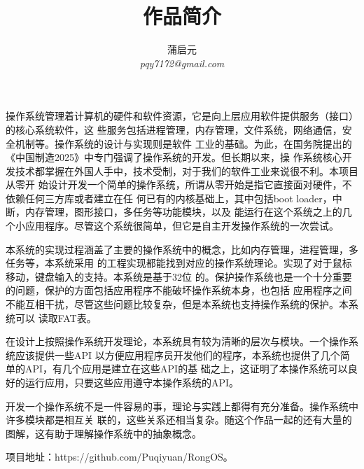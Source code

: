 \documentclass{wx672article} %
\title{作品简介}
\author{蒲启元 \\
\emph{pqy7172@gmail.com}}
\begin{document}
\maketitle{}
操作系统管理着计算机的硬件和软件资源，它是向上层应用软件提供服务（接口）的核心系统软件，这
些服务包括进程管理，内存管理，文件系统，网络通信，安全机制等。操作系统的设计与实现则是软件
工业的基础。为此，在国务院提出的《中国制造2025》中专门强调了操作系统的开发。但长期以来，操
作系统核心开发技术都掌握在外国人手中，技术受制，对于我们的软件工业来说很不利。本项目从零开
始设计开发一个简单的操作系统，所谓从零开始是指它直接面对硬件，不依赖任何三方库或者建立在任
何已有的内核基础上，其中包括boot loader，中断，内存管理，图形接口，多任务等功能模块，以及
能运行在这个系统之上的几个小应用程序。尽管这个系统很简单，但它是自主开发操作系统的一次尝试。

本系统的实现过程涵盖了主要的操作系统中的概念，比如内存管理，进程管理，多任务等，本系统采用
的工程实现都能找到对应的操作系统理论。实现了对于鼠标移动，键盘输入的支持。本系统是基于32位
的。保护操作系统也是一个十分重要的问题，保护的方面包括应用程序不能破坏操作系统本身，也包括
应用程序之间不能互相干扰，尽管这些问题比较复杂，但是本系统也支持操作系统的保护。本系统可以
读取FAT表。

在设计上按照操作系统开发理论，本系统具有较为清晰的层次与模块。一个操作系统应该提供一些API
以方便应用程序员开发他们的程序，本系统也提供了几个简单的API，有几个应用是建立在这些API的基
础之上，这证明了本操作系统可以良好的运行应用，只要这些应用遵守本操作系统的API。

开发一个操作系统不是一件容易的事，理论与实践上都得有充分准备。操作系统中许多模块都是相互关
联的，这些关系还相当复杂。随这个作品一起的还有大量的图解，这有助于理解操作系统中的抽象概念。

项目地址：https://github.com/Puqiyuan/RongOS。
\end{document}
